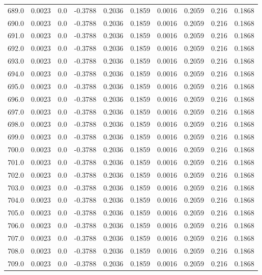 \begin{longtable}{lrrrrrrrrr}
689.0 & 0.0023 & 0.0 & -0.3788 & 0.2036 & 0.1859 & 0.0016 & 0.2059 & 0.216 & 0.1868 \\
690.0 & 0.0023 & 0.0 & -0.3788 & 0.2036 & 0.1859 & 0.0016 & 0.2059 & 0.216 & 0.1868 \\
691.0 & 0.0023 & 0.0 & -0.3788 & 0.2036 & 0.1859 & 0.0016 & 0.2059 & 0.216 & 0.1868 \\
692.0 & 0.0023 & 0.0 & -0.3788 & 0.2036 & 0.1859 & 0.0016 & 0.2059 & 0.216 & 0.1868 \\
693.0 & 0.0023 & 0.0 & -0.3788 & 0.2036 & 0.1859 & 0.0016 & 0.2059 & 0.216 & 0.1868 \\
694.0 & 0.0023 & 0.0 & -0.3788 & 0.2036 & 0.1859 & 0.0016 & 0.2059 & 0.216 & 0.1868 \\
695.0 & 0.0023 & 0.0 & -0.3788 & 0.2036 & 0.1859 & 0.0016 & 0.2059 & 0.216 & 0.1868 \\
696.0 & 0.0023 & 0.0 & -0.3788 & 0.2036 & 0.1859 & 0.0016 & 0.2059 & 0.216 & 0.1868 \\
697.0 & 0.0023 & 0.0 & -0.3788 & 0.2036 & 0.1859 & 0.0016 & 0.2059 & 0.216 & 0.1868 \\
698.0 & 0.0023 & 0.0 & -0.3788 & 0.2036 & 0.1859 & 0.0016 & 0.2059 & 0.216 & 0.1868 \\
699.0 & 0.0023 & 0.0 & -0.3788 & 0.2036 & 0.1859 & 0.0016 & 0.2059 & 0.216 & 0.1868 \\
700.0 & 0.0023 & 0.0 & -0.3788 & 0.2036 & 0.1859 & 0.0016 & 0.2059 & 0.216 & 0.1868 \\
701.0 & 0.0023 & 0.0 & -0.3788 & 0.2036 & 0.1859 & 0.0016 & 0.2059 & 0.216 & 0.1868 \\
702.0 & 0.0023 & 0.0 & -0.3788 & 0.2036 & 0.1859 & 0.0016 & 0.2059 & 0.216 & 0.1868 \\
703.0 & 0.0023 & 0.0 & -0.3788 & 0.2036 & 0.1859 & 0.0016 & 0.2059 & 0.216 & 0.1868 \\
704.0 & 0.0023 & 0.0 & -0.3788 & 0.2036 & 0.1859 & 0.0016 & 0.2059 & 0.216 & 0.1868 \\
705.0 & 0.0023 & 0.0 & -0.3788 & 0.2036 & 0.1859 & 0.0016 & 0.2059 & 0.216 & 0.1868 \\
706.0 & 0.0023 & 0.0 & -0.3788 & 0.2036 & 0.1859 & 0.0016 & 0.2059 & 0.216 & 0.1868 \\
707.0 & 0.0023 & 0.0 & -0.3788 & 0.2036 & 0.1859 & 0.0016 & 0.2059 & 0.216 & 0.1868 \\
708.0 & 0.0023 & 0.0 & -0.3788 & 0.2036 & 0.1859 & 0.0016 & 0.2059 & 0.216 & 0.1868 \\
709.0 & 0.0023 & 0.0 & -0.3788 & 0.2036 & 0.1859 & 0.0016 & 0.2059 & 0.216 & 0.1868 \\

\end{longtable}
